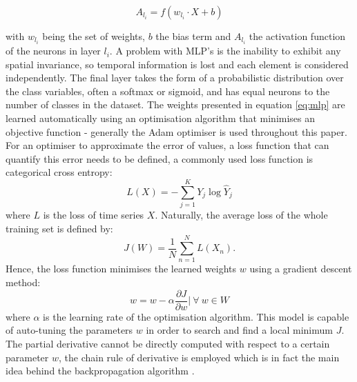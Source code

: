 \documentclass[journal]{IEEEtran}
\begin{document}
\begin{equation}\label{eq:mlp}
A_{l_i} = f(w_{l_i} \cdot X + b)
\end{equation}

with $w_{l_i}$ being the set of weights, $b$ the bias term and $A_{l_i}$ the activation function of the neurons in layer $l_i$. A problem with MLP's is the inability to exhibit any spatial invariance, so temporal information is lost and each element is considered independently. The final layer takes the form of a probabilistic distribution over the class variables, often a softmax or sigmoid, and has equal neurons to the number of classes in the dataset. The weights presented in equation \ref{eq:mlp} are learned automatically using an optimisation algorithm that minimises an objective function - generally the Adam optimiser is used throughout this paper. For an optimiser to approximate the error of values, a loss function that can quantify this error needs to be defined, a commonly used loss function is categorical cross entropy:
\begin{equation}\label{eq:catcrossentropy}
    L(X) = - \sum_{j=1}^{K}{Y_j \log \hat{Y}_j}
\end{equation}
where $L$ is the loss of time series $X$. Naturally, the average loss of the whole training set is defined by:
\begin{equation}\label{eq:model-loss}
    J(W) = \frac{1}{N} \sum_{n=1}^{N}{L(X_n)}.
\end{equation}
Hence, the loss function minimises the learned weights $w$ using a gradient descent method:
\begin{equation}
    w = w - \alpha \frac{\partial J}{\partial w} \bigg\rvert \ \forall \ w \in W
\end{equation}
where $\alpha$ is the learning rate of the optimisation algorithm. This model is capable of auto-tuning the parameters $w$ in order to search and find a local minimum $J$. The partial derivative cannot be directly computed with respect to a certain parameter $w$, the chain rule of derivative is employed which is in fact the main idea behind the backpropagation algorithm \cite{lecun1998b}.
\end{document}
